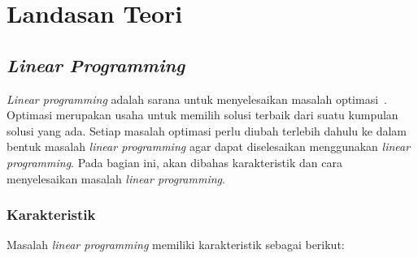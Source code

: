 \chapter{Landasan Teori}
\label{chap:teori}

\section{\textit{Linear Programming}}

\textit{Linear programming} adalah sarana untuk menyelesaikan masalah optimasi~\cite{winston2004operations}. Optimasi merupakan usaha untuk memilih solusi terbaik dari suatu kumpulan solusi yang ada. Setiap masalah optimasi perlu diubah terlebih dahulu ke dalam bentuk masalah \textit{linear programming} agar dapat diselesaikan menggunakan \textit{linear programming}. Pada bagian ini, akan dibahas karakteristik dan cara menyelesaikan masalah \textit{linear programming}.

\subsection{Karakteristik}
Masalah \textit{linear programming} memiliki karakteristik sebagai berikut:

